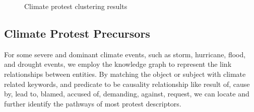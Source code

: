 \begin{figure}[t]
	\centering
	\caption{Climate protest clustering results}
\label{clusters}
\end{figure}


\subsection{Climate Protest Precursors}
For some severe and dominant climate events, such as storm, hurricane, flood, and drought events, we employ the knowledge graph to represent the link relationships between entities. By matching the object or subject with climate related keywords, and predicate to be causality relationship like result of, cause by, lead to, blamed, accused of, demanding, against, request, we can locate and further identify the pathways of most protest descriptors.

